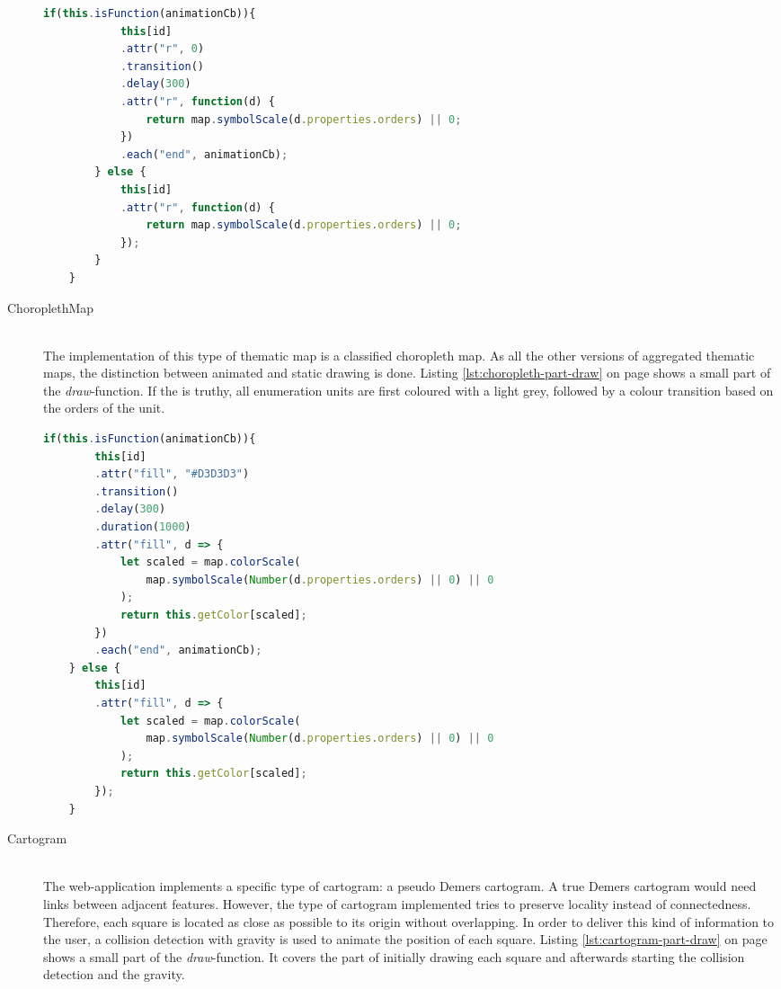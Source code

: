 \begin{description}
\begin{lstlisting}[language=JavaScript, caption={The draw-function of the ProportionalSymbolMap-class}, label={lst:psm-draw}]
        if(this.isFunction(animationCb)){
            this[id]
            .attr("r", 0)
            .transition()
            .delay(300)
            .attr("r", function(d) {
                return map.symbolScale(d.properties.orders) || 0;
            })
            .each("end", animationCb);
        } else {
            this[id]
            .attr("r", function(d) {
                return map.symbolScale(d.properties.orders) || 0;
            });
        }
    }
\end{lstlisting}

\item[ChoroplethMap] \hfill \\
The implementation of this type of thematic map is a classified choropleth map. As all the other versions of aggregated thematic maps, the distinction between animated and static drawing is done. Listing \ref{lst:choropleth-part-draw} on page \pageref{lst:choropleth-part-draw} shows a small part of the \textit{draw}-function. If the  is truthy, all enumeration units are first coloured with a light grey, followed by a colour transition based on the orders of the unit.

\begin{lstlisting}[language=JavaScript, caption={The draw-function of the ProportionalSymbolMap-class}, label={lst:choropleth-part-draw}]
    if(this.isFunction(animationCb)){
        this[id]
        .attr("fill", "#D3D3D3")
        .transition()
        .delay(300)
        .duration(1000)
        .attr("fill", d => {
            let scaled = map.colorScale(
                map.symbolScale(Number(d.properties.orders) || 0) || 0
            );
            return this.getColor[scaled];
        })
        .each("end", animationCb);
    } else {
        this[id]
        .attr("fill", d => {
            let scaled = map.colorScale(
                map.symbolScale(Number(d.properties.orders) || 0) || 0
            );
            return this.getColor[scaled];
        });
    }
\end{lstlisting}


\item[Cartogram] \hfill \\
The web-application implements a specific type of cartogram: a pseudo Demers cartogram. A true Demers cartogram would need links between adjacent features. However, the type of cartogram implemented tries to preserve locality instead of connectedness. Therefore, each square is located as close as possible to its origin without overlapping. In order to deliver this kind of information to the user, a collision detection with gravity is used to animate the position of each square. Listing \ref{lst:cartogram-part-draw} on page \pageref{lst:cartogram-part-draw} shows a small part of the \textit{draw}-function. It covers the part of initially drawing each square and afterwards starting the collision detection and the gravity.


\end{description}
